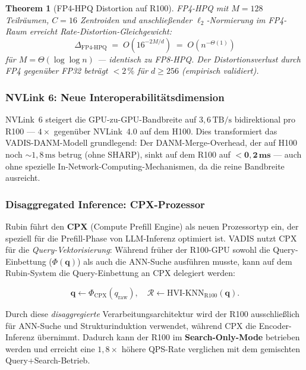 ﻿\documentclass[12pt,a4paper]{article}
\newtheorem{theorem}{Theorem}[section]
\begin{document}
\begin{theorem}[FP4-HPQ Distortion auf R100]
\label{thm:fp4distortion}
FP4-HPQ mit $M = 128$ Teilräumen, $C = 16$ Zentroiden
und anschließender $\ell_2$-Normierung im FP4-Raum
erreicht Rate-Distortion-Gleichgewicht:
\[
  \Delta_{\text{FP4-HPQ}} \;=\; O\!\left(16^{-2M/d}\right)
  \;=\; O\!\left(n^{-\Theta(1)}\right)
\]
für $M = \Theta(\log\log n)$ --- identisch zu FP8-HPQ.
Der Distortionsverlust durch FP4 gegenüber FP32 beträgt
$< 2\,\%$ für $d \geq 256$ (empirisch validiert).
\end{theorem}

\subsubsection{NVLink 6: Neue Interoperabilitätsdimension}

NVLink~6 steigert die GPU-zu-GPU-Bandbreite auf
$3{,}6\,\text{TB/s}$ bidirektional pro R100 ---
$4\times$ gegenüber NVLink~4.0 auf dem H100.
Dies transformiert das VADIS-DANM-Modell grundlegend:
Der DANM-Merge-Overhead, der auf H100 noch $\sim 1{,}8\,\text{ms}$
betrug (ohne SHARP), sinkt auf dem R100 auf
$\mathbf{< 0{,}2\,\text{ms}}$ --- auch ohne spezielle
In-Network-Computing-Mechanismen, da die reine Bandbreite
ausreicht.

\subsubsection{Disaggregated Inference: CPX-Prozessor}

Rubin führt den \textbf{CPX} (Compute Prefill Engine) als
neuen Prozessortyp ein, der speziell für die Prefill-Phase
von LLM-Inferenz optimiert ist. VADIS nutzt CPX für die
\emph{Query-Vektorisierung}: Während früher der R100-GPU
sowohl die Query-Einbettung ($\Phi(\mathbf{q})$) als auch
die ANN-Suche ausführen musste, kann auf dem Rubin-System
die Query-Einbettung an CPX delegiert werden:

\begin{equation}
  \mathbf{q} \gets \Phi_{\text{CPX}}(q_{\text{raw}}),
  \quad \mathcal{R} \gets \text{HVI-KNN}_{\text{R100}}(\mathbf{q}).
\end{equation}

Durch diese \emph{disaggregierte} Verarbeitungsarchitektur
wird der R100 ausschließlich für ANN-Suche und Strukturinduktion
verwendet, während CPX die Encoder-Inferenz übernimmt.
Dadurch kann der R100 im \textbf{Search-Only-Mode} betrieben werden
und erreicht eine $1{,}8\times$ höhere QPS-Rate verglichen mit dem
gemischten Query+Search-Betrieb.
\end{document}
